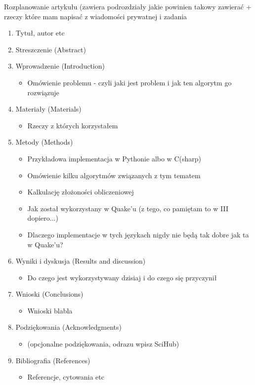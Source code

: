\documentclass[12pt]{article}
\begin{document}
Rozplanowanie artykułu (zawiera podrozdziały jakie powinien takowy zawierać + rzeczy które mam napisać z wiadomości prywatnej i zadania

\begin{enumerate}
    \item Tytuł, autor etc
    \item Streszczenie (Abstract)
    \item Wprowadzenie (Introduction)
    \begin{itemize}
        \item Omówienie problemu - czyli jaki jest problem i jak ten algorytm go rozwiązuje
    \end{itemize}
    \item Materiały (Materials) 
    \begin{itemize}
        \item Rzeczy z których korzystałem
    \end{itemize}
    \item Metody (Methods)
    \begin{itemize}
        \item Przykładowa implementacja w Pythonie albo w C(sharp)
        \item Omówienie kilku algorytmów związanych z tym tematem
        \item Kalkulację złożoności obliczeniowej
        \item Jak został wykorzystany w Quake'u (z tego, co pamiętam to w III dopiero...)
        \item Dlaczego implementacje w tych językach nigdy nie będą tak dobre jak ta w Quake'u?
    \end{itemize}
    \item Wyniki i dyskusja (Results and discussion)
    \begin{itemize}
        \item Do czego jest wykorzystywany dzisiaj i do czego się przyczynił
    \end{itemize}
    \item Wnioski (Conclusions)
    \begin{itemize}
        \item Wnioski blabla
    \end{itemize}
    \item Podziękowania (Acknowledgments)
    \begin{itemize}
        \item (opcjonalne podziękowania, odrazu wpisz SciHub)
    \end{itemize}
    \item Bibliografia (References)
    \begin{itemize}
        \item Referencje, cytowania etc
    \end{itemize}
\end{enumerate}
\end{document}
